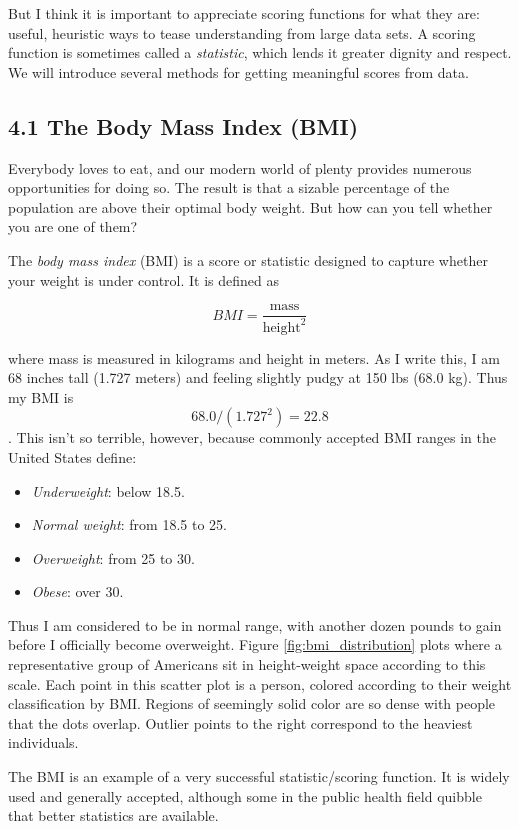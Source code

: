\documentclass[10pt]{article}
\begin{document}
But I think it is important to appreciate scoring functions for what they are: useful, heuristic ways to tease understanding from large data sets. A scoring function is sometimes called a \textit{statistic}, which lends it greater dignity and respect. We will introduce several methods for getting meaningful scores from data.

\subsection*{4.1 The Body Mass Index (BMI)}
Everybody loves to eat, and our modern world of plenty provides numerous opportunities for doing so. The result is that a sizable percentage of the population are above their optimal body weight. But how can you tell whether you are one of them?

The \textit{body mass index} (BMI) is a score or statistic designed to capture whether your weight is under control. It is defined as

\[
BMI = \frac{\text{mass}}{\text{height}^2}
\]

where mass is measured in kilograms and height in meters. As I write this, I am 68 inches tall (1.727 meters) and feeling slightly pudgy at 150 lbs (68.0 kg). Thus my BMI is \[68.0/\left(1.727^2\right) = 22.8\]. This isn't so terrible, however, because commonly accepted BMI ranges in the United States define:

\begin{itemize}
  \item \textit{Underweight}: below 18.5.
  \item \textit{Normal weight}: from 18.5 to 25.
  \item \textit{Overweight}: from 25 to 30.
  \item \textit{Obese}: over 30.
\end{itemize}

Thus I am considered to be in normal range, with another dozen pounds to gain before I officially become overweight. Figure \ref{fig:bmi_distribution} plots where a representative group of Americans sit in height-weight space according to this scale. Each point in this scatter plot is a person, colored according to their weight classification by BMI. Regions of seemingly solid color are so dense with people that the dots overlap. Outlier points to the right correspond to the heaviest individuals.

The BMI is an example of a very successful statistic/scoring function. It is widely used and generally accepted, although some in the public health field quibble that better statistics are available.
\end{document}
